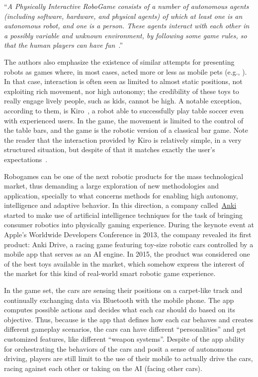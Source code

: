 ``\textit{A Physically Interactive RoboGame consists of a number of autonomous agents (including software, hardware, and physical agents) of which at least one is an autonomous robot, and one is a person. These agents interact with each other in a possibly variable and unknown environment, by following some game rules, so that the human players can have fun}~\cite{martinoia2013physically}.''

The authors also emphasize the existence of similar attempts for presenting robots as games where, in most cases, acted more or less as mobile pets (e.g., \cite{Fujita1997,Shibata1996}). In that case, interaction is often seen as limited to almost static positions, not exploiting rich movement, nor high autonomy; the credibility of these toys to really engage lively people, such as kids, cannot be high. A notable exception, according to them, is Kiro~\cite{weigel2005kiro}, a robot able to successfully play table soccer even with experienced users. In the game, the movement is limited to the control of the table bars, and the game is the robotic version of a classical bar game. Note the reader that the interaction provided by Kiro is relatively simple, in a very structured situation, but despite of that it matches exactly the user's expectations~\cite{martinoia2013physically}.

Robogames can be one of the next robotic products for the mass technological market, thus demanding a large exploration of new methodologies and application, specially to what concerns methods for enabling high autonomy, intelligence and adaptive behavior. In this direction, a company called~\href{https://anki.com/en-us}{Anki} started to make use of artificial intelligence techniques for the task of bringing consumer robotics into physically gaming experience. During the keynote event at Apple's Worldwide Developers Conference in 2013, the company revealed its first product: Anki Drive, a racing game featuring toy-size robotic cars controlled by a mobile app that serves as an AI engine. In 2015, the product was considered one of the best toys available in the market, which somehow express the interest of the market for this kind of real-world smart robotic game experience. 

In the game set, the cars are sensing their positions on a carpet-like track and continually exchanging data via Bluetooth with the mobile phone. The app computes possible actions and decides what each car should do based on its objective. Thus, because is the app that defines how each car behaves and creates different gameplay scenarios, the cars can have different ``personalities'' and get customized features, like different ``weapon systems''. Despite of the app ability for orchestrating the behaviors of the cars and posit a sense of autonomous driving, players are still limit to the use of their mobile to actually drive the cars, racing against each other or taking on the AI (facing other cars).


